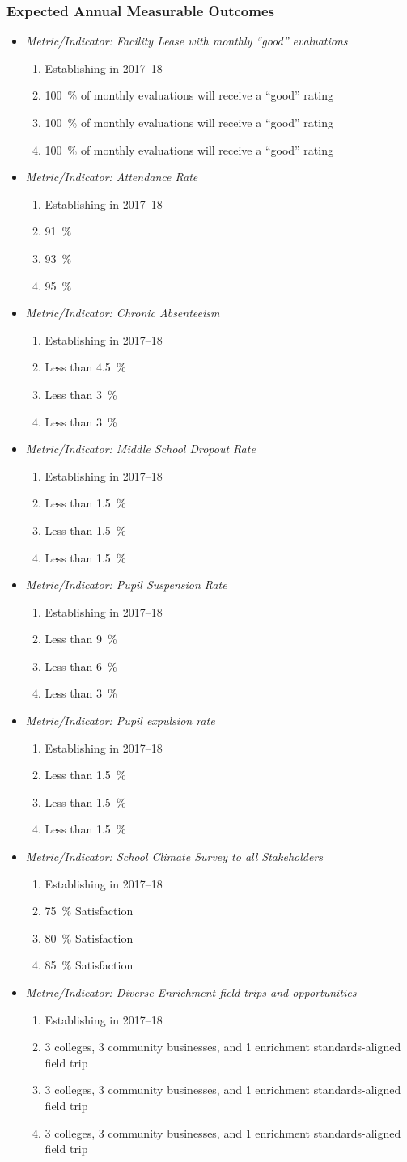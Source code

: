 \documentclass{article}
\makeatletter
\newcounter{goal}[section] %
\newcommand*{\expout}[1]{%
	\expandafter\@expout\csname c@#1\endcsname%
}
\newcommand*{\@expout}[1]{%
	$\ifcase\intcalcAdd{1}{\intcalcMod{\intcalcSub{#1}{1}}{4}}
		\or{\text{Baseline:}}
		\or{\text{2017--18:}}
		\or{\text{2018--19:}}
		\or{\text{2019--20:}}
    \else\@ctrerr\fi$
}
\newcommand{\expoutcome}[5]{
	\item
	{\em Metric/Indicator: #1}
	\begin{enumerate}[label=\expout*]
		\setlength\itemindent{40pt}
		\item #2
		\item #3
		\item #4
		\item #5
	\end{enumerate}
}
\newenvironment{expoutcomes}
	{
		\subsubsection{Expected Annual Measurable Outcomes}
		\begin{itemize}[label={}]
	}
	{\end{itemize}}
\newcounter{action}[goal]
\makeatother
\begin{document}
\begin{expoutcomes}
	\expoutcome
	{Facility Lease with monthly ``good'' evaluations}
	{Establishing in 2017--18}
	{\SI{100}{\percent} of monthly evaluations will receive a ``good'' rating}
	{\SI{100}{\percent} of monthly evaluations will receive a ``good'' rating}
	{\SI{100}{\percent} of monthly evaluations will receive a ``good'' rating}
	\expoutcome
	{Attendance Rate}
	{Establishing in 2017--18}
	{\SI{91}{\percent}}
	{\SI{93}{\percent}}
	{\SI{95}{\percent}}
	\expoutcome
	{Chronic Absenteeism}
	{Establishing in 2017--18}
	{Less than \SI{4.5}{\percent}}
	{Less than \SI{3}{\percent}}
	{Less than \SI{3}{\percent}}
	\expoutcome
	{Middle School Dropout Rate}
	{Establishing in 2017--18}
	{Less than \SI{1.5}{\percent}}
	{Less than \SI{1.5}{\percent}}
	{Less than \SI{1.5}{\percent}}
	\expoutcome
	{Pupil Suspension Rate}
	{Establishing in 2017--18}
	{Less than \SI{9}{\percent}}
	{Less than \SI{6}{\percent}}
	{Less than \SI{3}{\percent}}
	\expoutcome
	{Pupil expulsion rate}
	{Establishing in 2017--18}
	{Less than \SI{1.5}{\percent}}
	{Less than \SI{1.5}{\percent}}
	{Less than \SI{1.5}{\percent}}
	\expoutcome
	{School Climate Survey to all Stakeholders}
	{Establishing in 2017--18}
	{\SI{75}{\percent} Satisfaction}
	{\SI{80}{\percent} Satisfaction}
	{\SI{85}{\percent} Satisfaction}
	\expoutcome
	{Diverse Enrichment field trips and opportunities}
	{Establishing in 2017--18}
	{3 colleges, 3 community businesses, and 1 enrichment standards-aligned field trip}
	{3 colleges, 3 community businesses, and 1 enrichment standards-aligned field trip}
	{3 colleges, 3 community businesses, and 1 enrichment standards-aligned field trip}
\end{expoutcomes}
\end{document}
